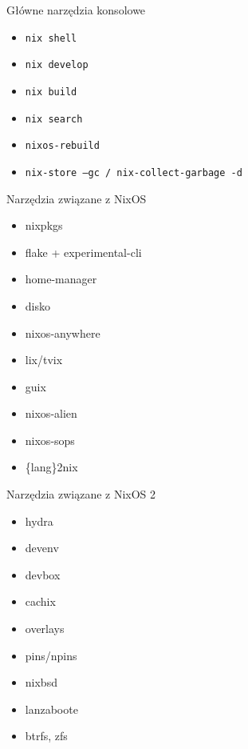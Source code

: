 \documentclass{beamer}
\begin{document}
\begin{frame}{Główne narzędzia konsolowe}
    \begin{itemize}
        \item \texttt{nix shell}
        \item \texttt{nix develop}
        \item \texttt{nix build}
        \item \texttt{nix search}
        \item \texttt{nixos-rebuild}
        \item \texttt{nix-store --gc / nix-collect-garbage -d}
    \end{itemize}
\end{frame}

\begin{frame}{Narzędzia związane z NixOS}
    \begin{itemize}
        \item nixpkgs
        \item flake + experimental-cli
        \item home-manager
        \item disko
        \item nixos-anywhere
        \item lix/tvix
        \item guix
        \item nixos-alien
        \item nixos-sops
        \item \{lang\}2nix
    \end{itemize}
\end{frame}

\begin{frame}{Narzędzia związane z NixOS 2}
    \begin{itemize}
        \item hydra
        \item devenv
        \item devbox
        \item cachix
        \item overlays
        \item pins/npins
        \item nixbsd
        \item lanzaboote
        \item btrfs, zfs
    \end{itemize}
\end{frame}
\end{document}
